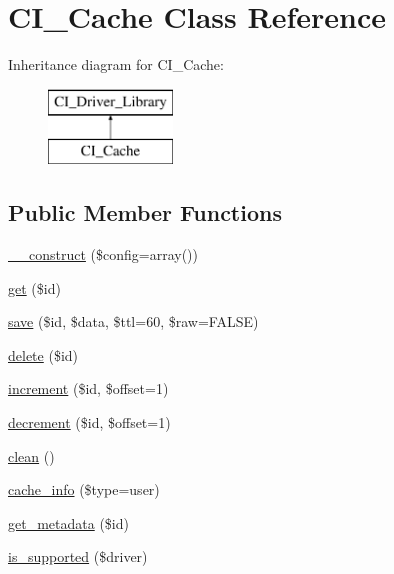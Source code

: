 \hypertarget{class_c_i___cache}{}\section{C\+I\+\_\+\+Cache Class Reference}
\label{class_c_i___cache}
Inheritance diagram for C\+I\+\_\+\+Cache\+:\begin{figure}[H]
\begin{center}
\leavevmode
\includegraphics[height=2.000000cm]{class_c_i___cache}
\end{center}
\end{figure}
\subsection*{Public Member Functions}
\begin{DoxyCompactItemize}
\item 
\mbox{\hyperlink{class_c_i___cache_adeccd63a6b7d3de9291862910225fe2c}{\+\_\+\+\_\+construct}} (\$config=array())
\item 
\mbox{\hyperlink{class_c_i___cache_a6633ccec6f26046dc41a8bc0324e3c0e}{get}} (\$id)
\item 
\mbox{\hyperlink{class_c_i___cache_a8630c89121aaab66ab72d154f4b94ba9}{save}} (\$id, \$data, \$ttl=60, \$raw=F\+A\+L\+SE)
\item 
\mbox{\hyperlink{class_c_i___cache_a623c2e1490216c918f261f5bccd3c34f}{delete}} (\$id)
\item 
\mbox{\hyperlink{class_c_i___cache_ad38861348c6790361b2b01363a6b0df8}{increment}} (\$id, \$offset=1)
\item 
\mbox{\hyperlink{class_c_i___cache_a01a94ff11c28a8ada46914198f3fefae}{decrement}} (\$id, \$offset=1)
\item 
\mbox{\hyperlink{class_c_i___cache_a0893e8103f4384c7edc7602618754c10}{clean}} ()
\item 
\mbox{\hyperlink{class_c_i___cache_aa4dd2ef4369608888204bbc5f810a2b7}{cache\+\_\+info}} (\$type=\textquotesingle{}user\textquotesingle{})
\item 
\mbox{\hyperlink{class_c_i___cache_a908e8631c7156e956182249e0eeddc4e}{get\+\_\+metadata}} (\$id)
\item 
\mbox{\hyperlink{class_c_i___cache_a8e75aa48fba56a8e8ef8c0816b7ccb5d}{is\+\_\+supported}} (\$driver)
\end{DoxyCompactItemize}
